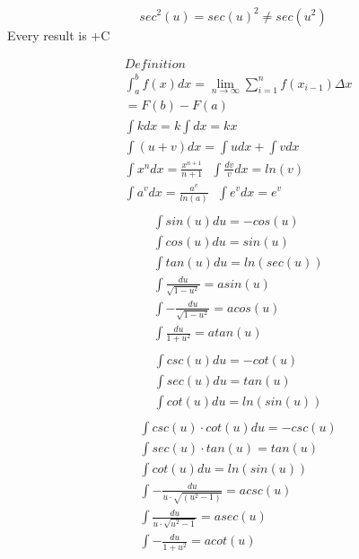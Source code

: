 \documentclass[fleqn]{article}
\begin{document}
\[sec^2(u)=sec(u)^2 \ne sec(u^2)\]
Every result is +C
\begin{vwcol}[widths={0.2,0.6,0.6,0.2}, sep=.5cm, justify=flush,rule=2pt,indent=0em] 
    \begin{align*}
        &Definition\\
        &\int_a^b f(x) dx = \lim_{{n \to \infty}} \sum_{{i=1}}^{n} f(x_{i-1}) \Delta x\\
        &=F(b)-F(a)\\
        &\int kdx = k\int  dx = kx\\
        &\int (u + v)dx = \int u dx + \int vdx \\
        &\int x^ndx=\frac{x^{n+1}}{n+1} \textbf{ } \int \frac{dv}{v}dx= ln(v)\\
        &\int a^vdx=\frac{a^v}{ln(a)} \textbf{ } \int e^vdx=e^v
    \end{align*}
    \begin{align*}
        \\&\int sin(u)du = -cos(u)
        \\&\int cos(u)du = sin(u)
        \\&\int tan(u)du = ln(sec(u))
        \\&\int \frac{du}{\sqrt{1-u^2}} = asin(u) 
        \\&\int -\frac{du}{\sqrt{1-u^2}} = acos(u) 
        \\&\int \frac{du}{1+u^2} = atan(u) 
    \end{align*}
    \begin{align*}
        \\&\int csc(u)du = -cot(u)
        \\&\int sec(u)du = tan(u)
        \\&\int cot(u)du = ln(sin(u))
    \end{align*}
    \begin{align*}
        \\&\int csc(u)\cdot cot(u) du = -csc(u)
        \\&\int sec(u)\cdot tan(u) = tan(u)
        \\&\int cot(u)du = ln(sin(u))
        \\&\int -\frac{du}{u\cdot \sqrt{(u^2-1)}} = acsc(u) 
        \\&\int \frac{du}{u\cdot \sqrt{u^2-1}} = asec(u) 
        \\&\int -\frac{du}{1+u^2} = acot(u) 
    \end{align*}
\end{vwcol}
\textbf{\\}
\end{document}
